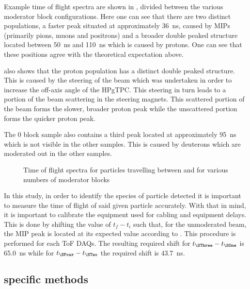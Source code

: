 Example time of flight spectra are shown in , divided between the various moderator block configurations.
Here one can see that there are two distinct populations, a faster peak situated at approximately \SI{36}{\nano\second}, caused by MIPs (primarily pions, muons and positrons) and a broader double peaked structure located between \SI{50}{\nano\second} and \SI{110}{\nano\second} which is caused by protons.
One can see that these positions agree with the theoretical expectation above.

 also shows that the proton population has a distinct double peaked structure.
This is caused by the steering of the beam which was undertaken in order to increase the off-axis angle of the HPgTPC.
This steering in turn leads to a portion of the beam scattering in the steering magnets.
This scattered portion of the beam forms the slower, broader proton peak while the unscattered portion forms the quicker proton peak.

The 0 block sample also contains a third peak located at approximately \SI{95}{\nano\second} which is not visible in the other samples.
This is caused by deuterons which are moderated out in the other samples.

\begin{figure}[h]
  \begin{adjustbox}{max totalsize={.8\linewidth}, center}
    
  \end{adjustbox}
  \caption[Time of flight spectra for particles travelling between \SOne and \SThree for various numbers of moderator blocks]{Time of flight spectra for particles travelling between \SOne and \SThree for various numbers of moderator blocks}
  \label{fig:s3Tof}
\end{figure}

In this study, in order to identify the species of particle detected it is important to measure the time of flight of said given particle accurately.
With that in mind, it is important to calibrate the equipment used for cabling and equipment delays.
This is done by shifting the value of $t_{f}-t_{i}$ such that, for the unmoderated beam, the MIP peak is located at its expected value according to .
This procedure is performed for each ToF DAQs.
The resulting required shift for $t_{\SThree} - t_{\SOne}$ is \SI{65.0}{\nano\second} while for $t_{\SFour} - t_{\STwo}$ the required shift is \SI{43.7}{\nano\second}.

\subsection{\SThree specific methods}
\label{sec:hptpc_beam_flux:methods:s3}

